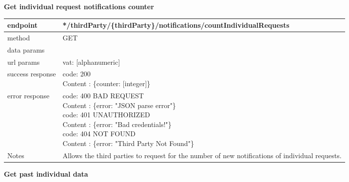 	\textbf{Get individual request notifications counter} \\

	\begin{tabularx}{\linewidth}{| l| l }
		\hline
		endpoint & */thirdParty/\{thirdParty\}/notifications/countIndividualRequests \\
		\hline
		method & GET \\
		\hline
		data params & \\
		\hline
		url params &
		\parbox{0.7\textwidth}{
			\bigskip
			vat: [alphanumeric]
			\bigskip
		} \\
		\hline
		success response &
		\parbox{0.7\textwidth}{
			\bigskip
			code: 200\\
			Content : \{counter: [integer]\}
			\bigskip
		} \\
		\hline
		error response &
		\parbox{0.7\textwidth}{
			\bigskip
			code: 400 BAD REQUEST \\
			Content : \{error: "JSON parse error"\}\\
			code: 401 UNAUTHORIZED \\
			Content : \{error: "Bad credentials!"\}\\
			code: 404 NOT FOUND \\
			Content : \{error: "Third Party Not Found"\}
			\bigskip
		} \\
		\hline
		Notes & 
		\parbox{0.7\textwidth}{
			\bigskip Allows the third parties to request for the number of new notifications of individual requests.
		\bigskip}  \\
		\hline
	\end{tabularx}
	
	\textbf{Get past individual data} \\

